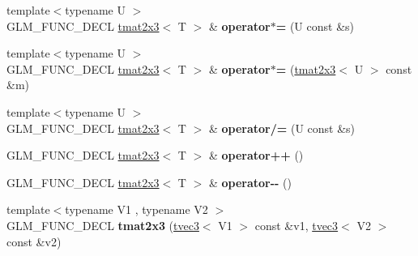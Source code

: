 \begin{DoxyCompactItemize}
\item 
\hypertarget{structglm_1_1detail_1_1tmat2x3_a36380d0c06b4770f2803d7bf890c4e3b}{}{\footnotesize template$<$typename U $>$ }\\G\+L\+M\+\_\+\+F\+U\+N\+C\+\_\+\+D\+E\+C\+L \hyperlink{structglm_1_1detail_1_1tmat2x3}{tmat2x3}$<$ T $>$ \& {\bfseries operator$\ast$=} (U const \&s)\label{structglm_1_1detail_1_1tmat2x3_a36380d0c06b4770f2803d7bf890c4e3b}

\item 
\hypertarget{structglm_1_1detail_1_1tmat2x3_ae7203d286817799431f77f54e7c3392d}{}{\footnotesize template$<$typename U $>$ }\\G\+L\+M\+\_\+\+F\+U\+N\+C\+\_\+\+D\+E\+C\+L \hyperlink{structglm_1_1detail_1_1tmat2x3}{tmat2x3}$<$ T $>$ \& {\bfseries operator$\ast$=} (\hyperlink{structglm_1_1detail_1_1tmat2x3}{tmat2x3}$<$ U $>$ const \&m)\label{structglm_1_1detail_1_1tmat2x3_ae7203d286817799431f77f54e7c3392d}

\item 
\hypertarget{structglm_1_1detail_1_1tmat2x3_a31472536b597683c09ea45d8f0c12bff}{}{\footnotesize template$<$typename U $>$ }\\G\+L\+M\+\_\+\+F\+U\+N\+C\+\_\+\+D\+E\+C\+L \hyperlink{structglm_1_1detail_1_1tmat2x3}{tmat2x3}$<$ T $>$ \& {\bfseries operator/=} (U const \&s)\label{structglm_1_1detail_1_1tmat2x3_a31472536b597683c09ea45d8f0c12bff}

\item 
\hypertarget{structglm_1_1detail_1_1tmat2x3_a871796f237c964f75c66db2ff7b107cf}{}G\+L\+M\+\_\+\+F\+U\+N\+C\+\_\+\+D\+E\+C\+L \hyperlink{structglm_1_1detail_1_1tmat2x3}{tmat2x3}$<$ T $>$ \& {\bfseries operator++} ()\label{structglm_1_1detail_1_1tmat2x3_a871796f237c964f75c66db2ff7b107cf}

\item 
\hypertarget{structglm_1_1detail_1_1tmat2x3_ab3ba2a1f3b1773fbd3c03aee24d47ece}{}G\+L\+M\+\_\+\+F\+U\+N\+C\+\_\+\+D\+E\+C\+L \hyperlink{structglm_1_1detail_1_1tmat2x3}{tmat2x3}$<$ T $>$ \& {\bfseries operator-\/-\/} ()\label{structglm_1_1detail_1_1tmat2x3_ab3ba2a1f3b1773fbd3c03aee24d47ece}

\item 
\hypertarget{structglm_1_1detail_1_1tmat2x3_a53c839191a496f91889b4aca31a2ab22}{}{\footnotesize template$<$typename V1 , typename V2 $>$ }\\G\+L\+M\+\_\+\+F\+U\+N\+C\+\_\+\+D\+E\+C\+L {\bfseries tmat2x3} (\hyperlink{structglm_1_1detail_1_1tvec3}{tvec3}$<$ V1 $>$ const \&v1, \hyperlink{structglm_1_1detail_1_1tvec3}{tvec3}$<$ V2 $>$ const \&v2)\label{structglm_1_1detail_1_1tmat2x3_a53c839191a496f91889b4aca31a2ab22}


\end{DoxyCompactItemize}
